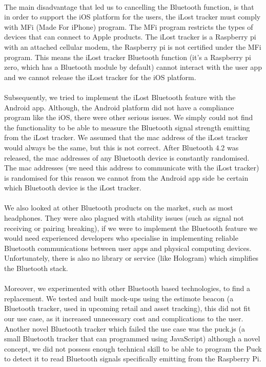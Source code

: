 \documentclass[12pt,a4paper]{article}
\begin{document}
        \paragraph{} The main disadvantage that led us to cancelling the Bluetooth function, is that in order to support the iOS platform for the users, the iLost tracker must comply with MFi (Made For iPhone) program. The MFi program restricts the types of devices that can connect to Apple products. The iLost tracker is a Raspberry pi with an attached cellular modem, the Raspberry pi is not certified under the MFi program. This means the iLost tracker Bluetooth function (it’s a Raspberry pi zero, which has a Bluetooth module by default) cannot interact with the user app and we cannot release the iLost tracker for the iOS platform.
        
        \paragraph{} Subsequently, we tried to implement the iLost Bluetooth feature with the Android app. Although, the Android platform did not have a compliance program like the iOS, there were other serious issues. We simply could not find the functionality to be able to measure the Bluetooth signal strength emitting from the iLost tracker.  We assumed that the mac address of the iLost tracker would always be the same, but this is not correct. After Bluetooth 4.2 was released, the mac addresses of any Bluetooth device is constantly randomised. The mac addresses (we need this address to communicate with the iLost tracker) is randomised for this reason we cannot from the Android app side be certain which Bluetooth device is the iLost tracker. 
        
        \paragraph{} We also looked at other Bluetooth products on the market, such as most headphones. They were also plagued with stability issues (such as signal not receiving or pairing breaking), if we were to implement the Bluetooth feature we would need experienced developers who specialise in implementing reliable Bluetooth communications between user apps and physical computing devices. Unfortunately, there is also no library or service (like Hologram) which simplifies the Bluetooth stack. 
        
        \paragraph{} Moreover, we experimented with other Bluetooth based technologies, to find a replacement. We tested and built mock-ups using the estimote beacon (a Bluetooth tracker, used in upcoming retail and asset tracking), this did not fit our use case, as it increased unnecessary cost and complications to the user. Another novel Bluetooth tracker which failed the use case was the puck.js (a small Bluetooth tracker that can programmed using JavaScript) although a novel concept, we did not possess enough technical skill to be able to program the Puck to detect it to read Bluetooth signals specifically emitting from the Raspberry Pi. 
        
\end{document}
